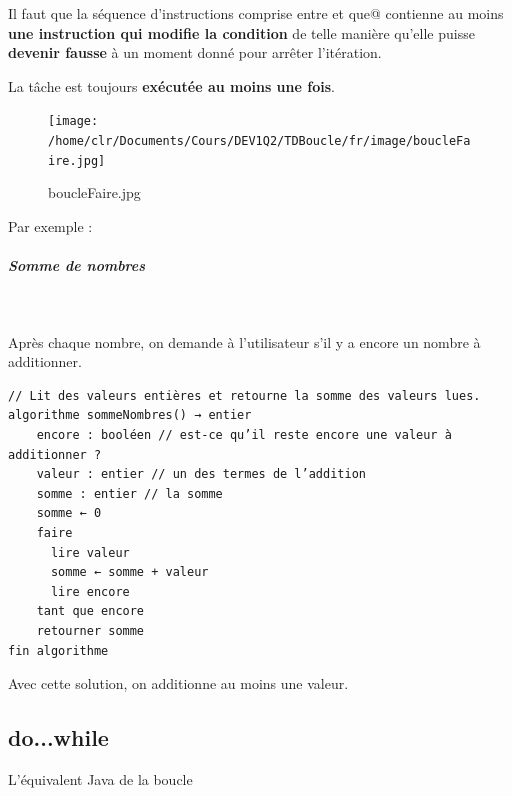 \documentclass[11pt,a4paper]{article}
\begin{document}
            \par
        
        Il faut que la s\'equence d'instructions comprise entre \verb@faire@ 
        et \verb@tant que@ contienne au moins 
        \textbf{une instruction qui modifie la condition} de telle mani\`ere 
        qu'elle puisse \textbf{devenir fausse} \`a un moment donn\'e pour arr\^eter l'it\'eration.
      
            \par
        
        La t\^ache est toujours \textbf{ex\'ecut\'ee au moins une fois}.
      
            \par
        \begin{figure}[hbt]
				    \begin{center}
					\texttt{[image: /home/clr/Documents/Cours/DEV1Q2/TDBoucle/fr/image/boucleFaire.jpg]}
						\end{center}
                
                    \caption[boucleFaire.jpg]{boucleFaire.jpg}
                \end{figure}
                    
            \par
        Par exemple : 
            \par
        
			
		\subparagraph{Somme de nombres} 
		
					\textcolor{white}{.} \par
				 Apr\`es chaque nombre, on demande \`a l'utilisateur s'il y a encore un nombre \`a additionner.
            \par
        \begin{verbatim}
// Lit des valeurs entières et retourne la somme des valeurs lues.
algorithme sommeNombres() → entier
    encore : booléen // est-ce qu’il reste encore une valeur à additionner ?
    valeur : entier // un des termes de l’addition
    somme : entier // la somme
    somme ← 0
    faire
      lire valeur
      somme ← somme + valeur
      lire encore
    tant que encore
    retourner somme
fin algorithme
      \end{verbatim}Avec cette solution, on additionne au moins une valeur.
            \par
        \subsection{do...while}
		    L'\'equivalent Java de la boucle 
		  
\end{document}
